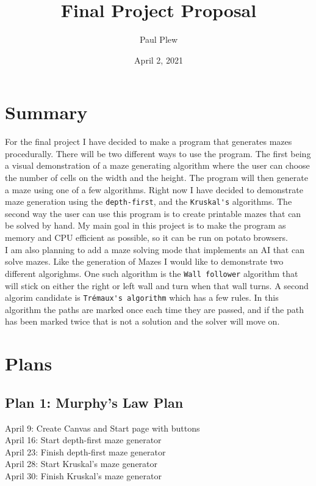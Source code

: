 \documentclass[12 pt]{article}
\title{Final Project Proposal}
\author{Paul Plew}
\date{April 2, 2021}
\begin{document}
\maketitle

\section*{Summary}
\hspace*{\parindent} For the final project I have decided to make a program that generates mazes procedurally. There will be two different ways to use the program. The first being a visual demonstration of a maze generating algorithm where the user can choose the number of cells on the width and the height. The program will then generate a maze using one of a few algorithms. Right now I have decided to demonstrate maze generation using the \verb|depth-first|, and the \verb|Kruskal's| algorithms. The second way the user can use this program is to create printable mazes that can be solved by hand. My main goal in this project is to make the program as memory and CPU efficient as possible, so it can be run on potato browsers. \\
\hspace*{\parindent}  I am also planning to add a maze solving mode that implements an AI that can solve mazes. Like the generation of Mazes I would like to demonstrate two different algorighms. One such algorithm is the \verb|Wall follower| algorithm that will stick on either the right or left wall and turn when that wall turns. A second algorim candidate is \verb|Trémaux's algorithm| which has a few rules. In this algorithm the paths are marked once each time they are passed, and if the path has been marked twice that is not a solution and the solver will move on.
\newpage
\section{Plans}
\subsection{Plan 1: Murphy's Law Plan}
\hspace*{\parindent} April 9: Create Canvas and Start page with buttons \\
\hspace*{\parindent} April 16: Start depth-first maze generator \\
\hspace*{\parindent} April 23: Finish depth-first maze generator \\
\hspace*{\parindent} April 28: Start Kruskal's maze generator \\
\hspace*{\parindent} April 30: Finish Kruskal's maze generator 
\end{document}
